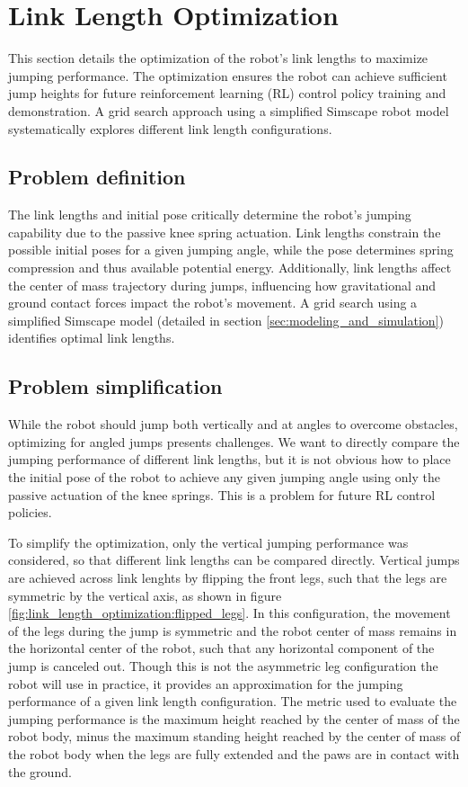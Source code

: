 \section{Link Length Optimization}
\label{sec:link_length_optimization}
This section details the optimization of the robot's link lengths to maximize jumping performance. The optimization ensures the robot can achieve sufficient jump heights for future reinforcement learning (RL) control policy training and demonstration. A grid search approach using a simplified Simscape robot model systematically explores different link length configurations.

\subsection{Problem definition}
The link lengths and initial pose critically determine the robot's jumping capability due to the passive knee spring actuation. Link lengths constrain the possible initial poses for a given jumping angle, while the pose determines spring compression and thus available potential energy. Additionally, link lengths affect the center of mass trajectory during jumps, influencing how gravitational and ground contact forces impact the robot's movement. A grid search using a simplified Simscape model (detailed in section \ref{sec:modeling_and_simulation}) identifies optimal link lengths.

\subsection{Problem simplification}

While the robot should jump both vertically and at angles to overcome obstacles, optimizing for angled jumps presents challenges. We want to directly compare the jumping performance of different link lengths, but it is not obvious how to place the initial pose of the robot to achieve any given jumping angle using only the passive actuation of the knee springs. This is a problem for future RL control policies.

To simplify the optimization, only the vertical jumping performance was considered, so that different link lengths can be compared directly. Vertical jumps are achieved across link lenghts by flipping the front legs, such that the legs are symmetric by the vertical axis, as shown in figure \ref{fig:link_length_optimization:flipped_legs}. In this configuration, the movement of the legs during the jump is symmetric and the robot center of mass remains in the horizontal center of the robot, such that any horizontal component of the jump is canceled out. Though this is not the asymmetric leg configuration the robot will use in practice, it provides an approximation for the jumping performance of a given link length configuration. The metric used to evaluate the jumping performance is the maximum height reached by the center of mass of the robot body, minus the maximum standing height reached by the center of mass of the robot body when the legs are fully extended and the paws are in contact with the ground.

